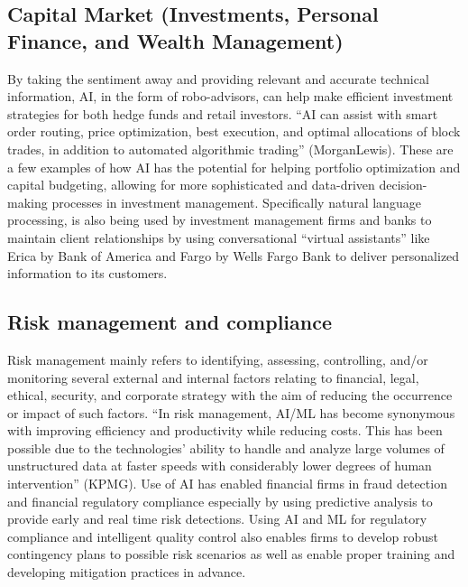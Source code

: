 \documentclass[
]{article}
\begin{document}
\hypertarget{capital-market-investments-personal-finance-and-wealth-management}{%
\subsection{Capital Market (Investments, Personal Finance, and Wealth Management)}\label{capital-market-investments-personal-finance-and-wealth-management}}

By taking the sentiment away and providing relevant and accurate technical information, AI, in the form of robo-advisors, can help make efficient investment strategies for both hedge funds and retail investors. ``AI can assist with smart order routing, price optimization, best execution, and optimal allocations of block trades, in addition to automated algorithmic trading'' (MorganLewis). These are a few examples of how AI has the potential for helping portfolio optimization and capital budgeting, allowing for more sophisticated and data-driven decision-making processes in investment management. Specifically natural language processing, is also being used by investment management firms and banks to maintain client relationships by using conversational ``virtual assistants'' like Erica by Bank of America and Fargo by Wells Fargo Bank to deliver personalized information to its customers.

\hypertarget{risk-management-and-compliance}{%
\subsection{Risk management and compliance}\label{risk-management-and-compliance}}

Risk management mainly refers to identifying, assessing, controlling, and/or monitoring several external and internal factors relating to financial, legal, ethical, security, and corporate strategy with the aim of reducing the occurrence or impact of such factors. ``In risk management, AI/ML has become synonymous with improving efficiency and productivity while reducing costs. This has been possible due to the technologies' ability to handle and analyze large volumes of unstructured data at faster speeds with considerably lower degrees of human intervention'' (KPMG). Use of AI has enabled financial firms in fraud detection and financial regulatory compliance especially by using predictive analysis to provide early and real time risk detections. Using AI and ML for regulatory compliance and intelligent quality control also enables firms to develop robust contingency plans to possible risk scenarios as well as enable proper training and developing mitigation practices in advance.
\end{document}
